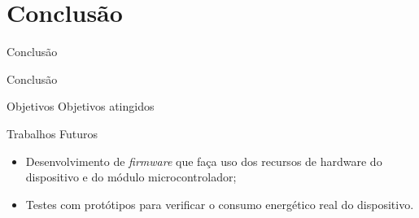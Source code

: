 \section{Conclusão}


\begin{frame}
    
    \centering
    \color{blue_theme}\huge{{Conclusão}}

\end{frame}


\begin{frame}{Conclusão}
    
    \begin{block}{Objetivos}
        Objetivos atingidos
    \end{block}

    \begin{block}{Trabalhos Futuros}

        \begin{itemize}
            \item Desenvolvimento de \textit{firmware} que
            faça uso dos recursos de hardware do dispositivo
            e do módulo microcontrolador;

            \item Testes com protótipos para verificar o 
            consumo energético real do dispositivo.


        \end{itemize}

        
    \end{block}




\end{frame}




\begin{frame}{}
    \centering
    \huge{}
    
    \vspace{1cm}
    
\end{frame}